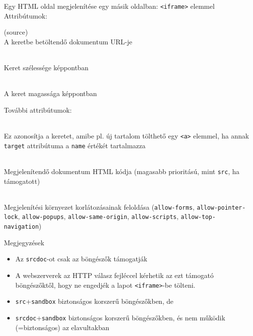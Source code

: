 \begin{frame}
  Egy HTML oldal megjelenítése egy másik oldalban: \texttt{<iframe>} elemmel
  \vfill
  Attribútumok:
  \begin{description}[m]
    \item[\texttt{src}] (source) \hfill \\ A keretbe betöltendő dokumentum URL-je
    \item[\texttt{width}] \hfill \\ Keret szélessége képpontban
    \item[\texttt{height}] \hfill \\ A keret magassága képpontban
  \end{description}
\end{frame}

\begin{frame}
  További attribútumok:
  \begin{description}[m]
    \item[\texttt{name}] \hfill \\ Ez azonosítja a keretet, amibe pl. új tartalom tölthető egy \texttt{<a>} elemmel, ha annak \texttt{target} attribútuma a \texttt{name} értékét tartalmazza
    \item[\texttt{srcdoc}] \hfill \\ Megjelenítendő dokumentum HTML kódja (magasabb prioritású, mint \texttt{src}, ha támogatott)
    \item[\texttt{sandbox}] \hfill \\ Megjelenítési környezet korlátozásainak feloldása (\texttt{allow-forms}, \texttt{allow-pointer-lock}, \texttt{allow-popups}, \texttt{allow-same-origin}, \texttt{allow-scripts}, \texttt{allow-top-navigation}) 
  \end{description}
\end{frame}

\begin{frame}
  Megjegyzések
  \begin{itemize}
    \item Az \texttt{srcdoc}-ot csak az  böngészők támogatják
    \item A webszerverek az  HTTP válasz fejléccel kérhetik az ezt támogató böngészőktől, hogy ne engedjék a lapot \texttt{<iframe>}-be tölteni.
    \item \texttt{src}+\texttt{sandbox} biztonságos korszerű böngészőkben, de 
    \item \texttt{srcdoc}+\texttt{sandbox} biztonságos korszerű böngészőkben, és nem működik (=biztonságos) az elavultakban
  \end{itemize}
\end{frame}

